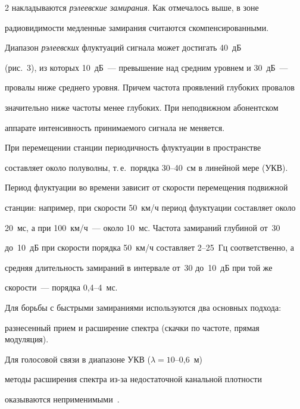 \begin{multicols}{2}
накладываются \textit{рэлеевские замирания}. Как отмечалось выше, в зоне 


радиовидимости медленные замирания считаются скомпенси\-ро\-ван\-ными.


     


     Диапазон \textit{рэлеевских} флуктуаций сигнала может достигать 40~дБ 


(рис.~3), из которых 10~дБ~--- превышение над средним уровнем и 30~дБ~--- 


провалы ниже среднего уровня. Причем частота проявлений глубоких провалов 


значительно ниже частоты менее глубоких. При неподвижном абонентском 


аппарате интенсивность принимаемого сигнала не меняется.


     


     При перемещении станции периодичность флуктуации в пространстве 


составляет около полуволны, т.\,е.\ порядка 30--40~см в линейной мере (УКВ). 


Период флуктуации во времени зависит от скорости перемещения подвижной 


станции: например, при скорости 50~км/ч период флуктуации составляет около 


20~мс, а при 100~км/ч~--- около 10~мс. Частота замираний глубиной от~30 


до~10~дБ при скорости порядка 50~км/ч составляет 2--25~Гц соответственно, а 


средняя длительность замираний в интервале от~30 до~10~дБ при той же 


скорости~--- порядка 0,4--4~мс. 


     


     Для борьбы с быстрыми замираниями используются два основных подхода: 


разнесенный прием и расширение спектра (скачки по частоте, прямая модуляция). 


Для голосовой связи в диапазоне УКВ ($\lambda=10$--0,6~м) 


методы расширения спектра из-за недостаточной канальной плотности 


оказываются неприменимыми~\cite{8-pr, 9-pr}. 


     


     \medskip



\end{multicols}
